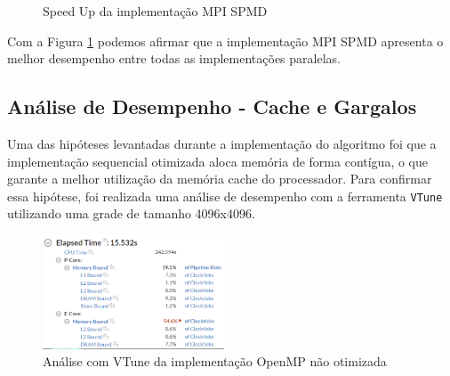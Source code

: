 \documentclass[conference]{IEEEtran}
\begin{document}
\begin{figure}[H]
    \centering
    \caption{Speed Up da implementação MPI SPMD}
    \label{fig:seq_mpi_spmd_speedup_bar_chart}
\end{figure}

Com a Figura \ref{fig:seq_mpi_spmd_speedup_bar_chart} podemos afirmar que a implementação MPI SPMD apresenta o melhor desempenho entre todas as implementações paralelas.

\subsection{Análise de Desempenho - Cache e Gargalos}

Uma das hipóteses levantadas durante a implementação do algoritmo foi que a implementação sequencial otimizada aloca memória de forma contígua, o que garante a melhor utilização da memória cache do processador. Para confirmar essa hipótese, foi realizada uma análise de desempenho com a ferramenta \texttt{VTune} utilizando uma grade de tamanho 4096x4096.

\begin{figure}[H]
    \centering
    \includegraphics[width=0.48\textwidth]{images/seq_og_vtune_cache.png}
    \caption{Análise com VTune da implementação OpenMP não otimizada}
    \label{fig:seq_og_vtune_cache}
\end{figure}
\end{document}
